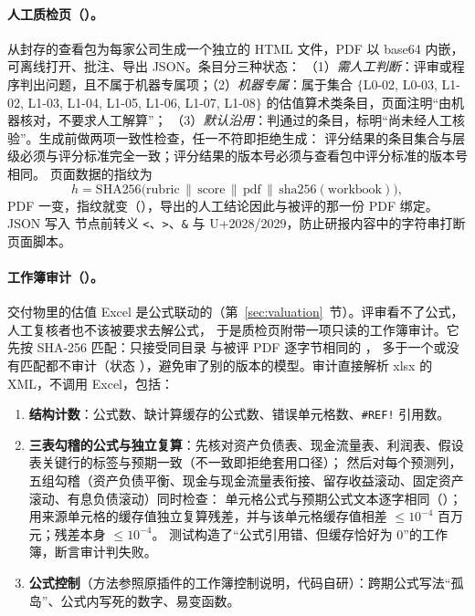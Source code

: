 \paragraph{人工质检页（）。}
从封存的查看包为每家公司生成一个独立的 HTML 文件，PDF 以 base64 内嵌，可离线打开、批注、导出 JSON。条目分三种状态：
（1）\emph{需人工判断}：评审或程序判出问题，且不属于机器专属项；（2）\emph{机器专属}：属于集合
$\{$L0-02, L0-03, L1-02, L1-03, L1-04, L1-05, L1-06, L1-07, L1-08$\}$ 的估值算术类条目，页面注明“由机器核对，不要求人工解算”；
（3）\emph{默认沿用}：判通过的条目，标明“尚未经人工核验”。生成前做两项一致性检查，任一不符即拒绝生成：
评分结果的条目集合与层级必须与评分标准完全一致；评分结果的版本号必须与查看包中评分标准的版本号相同。
页面数据的指纹为
\[
h=\mathrm{SHA256}\bigl(\text{rubric}\,\|\,\text{score}\,\|\,\text{pdf}\,\|\,\mathrm{sha256}(\text{workbook})\bigr),
\]
PDF 一变，指纹就变（），导出的人工结论因此与被评的那一份 PDF 绑定。
JSON 写入  节点前转义 \texttt{<}、\texttt{>}、\texttt{\&} 与 U+2028/2029，防止研报内容中的字符串打断页面脚本。

\paragraph{工作簿审计（）。}
交付物里的估值 Excel 是公式联动的（第~\ref{sec:valuation}~节）。评审看不了公式，人工复核者也不该被要求去解公式，
于是质检页附带一项只读的工作簿审计。它先按 SHA-256 匹配：只接受同目录  与被评 PDF 逐字节相同的 ，
多于一个或没有匹配都不审计（状态 ），避免审了别的版本的模型。审计直接解析 xlsx 的 XML，不调用 Excel，包括：
\begin{enumerate}
  \item \textbf{结构计数}：公式数、缺计算缓存的公式数、错误单元格数、\texttt{\#REF!} 引用数。
  \item \textbf{三表勾稽的公式与独立复算}：先核对资产负债表、现金流量表、利润表、假设表关键行的标签与预期一致（不一致即拒绝套用口径）；
        然后对每个预测列，五组勾稽（资产负债平衡、现金与现金流量表衔接、留存收益滚动、固定资产滚动、有息负债滚动）同时检查：
        单元格公式与预期公式文本逐字相同（）；用来源单元格的缓存值独立复算残差，并与该单元格缓存值相差 $\le 10^{-4}$ 百万元；残差本身 $\le 10^{-4}$。
        测试构造了“公式引用错、但缓存恰好为 0”的工作簿，断言审计判失败。
  \item \textbf{公式控制}（方法参照原插件的工作簿控制说明，代码自研）：跨期公式写法“孤岛”、公式内写死的数字、易变函数。
\end{enumerate}

